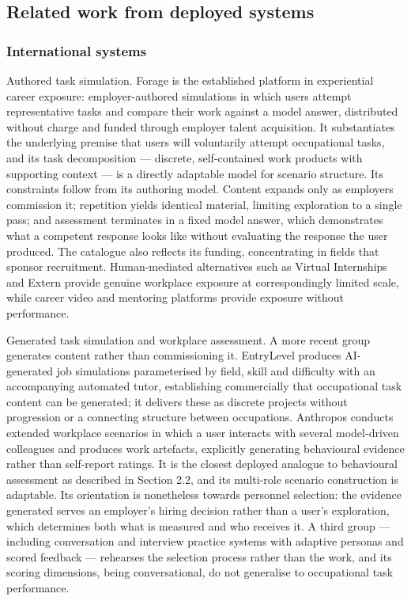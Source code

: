 \subsection{Related work from deployed systems}

\subsubsection{International systems}

Authored task simulation. Forage\cite{r83} is the established platform in experiential career exposure: employer-authored simulations in which users attempt representative tasks and compare their work against a model answer, distributed without charge and funded through employer talent acquisition. It substantiates the underlying premise that users will voluntarily attempt occupational tasks, and its task decomposition --- discrete, self-contained work products with supporting context --- is a directly adaptable model for scenario structure. Its constraints follow from its authoring model. Content expands only as employers commission it; repetition yields identical material, limiting exploration to a single pass; and assessment terminates in a fixed model answer, which demonstrates what a competent response looks like without evaluating the response the user produced. The catalogue also reflects its funding, concentrating in fields that sponsor recruitment. Human-mediated alternatives such as Virtual Internships and Extern provide genuine workplace exposure at correspondingly limited scale, while career video and mentoring platforms provide exposure without performance.

Generated task simulation and workplace assessment. A more recent group generates content rather than commissioning it. EntryLevel\cite{r84} produces AI-generated job simulations parameterised by field, skill and difficulty with an accompanying automated tutor, establishing commercially that occupational task content can be generated; it delivers these as discrete projects without progression or a connecting structure between occupations. Anthropos\cite{r85} conducts extended workplace scenarios in which a user interacts with several model-driven colleagues and produces work artefacts, explicitly generating behavioural evidence rather than self-report ratings. It is the closest deployed analogue to behavioural assessment as described in Section 2.2, and its multi-role scenario construction is adaptable. Its orientation is nonetheless towards personnel selection: the evidence generated serves an employer's hiring decision rather than a user's exploration, which determines both what is measured and who receives it. A third group --- including conversation and interview practice systems with adaptive personas and scored feedback\cite{r86} --- rehearses the selection process rather than the work, and its scoring dimensions, being conversational, do not generalise to occupational task performance.

